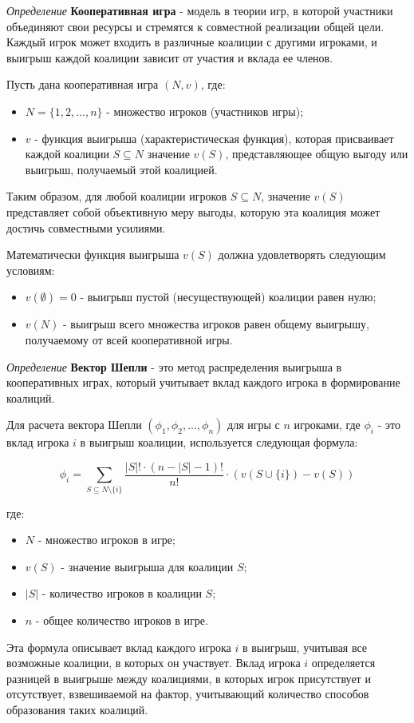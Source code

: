 \textit{Определение} \textbf{Кооперативная игра} - модель в теории игр, в которой участники  объединяют свои ресурсы и стремятся к совместной реализации общей цели. Каждый игрок может входить в различные коалиции с другими игроками, и выигрыш каждой коалиции зависит от участия и вклада ее членов.

Пусть дана кооперативная игра \( (N, v) \), 
где:\begin{itemize}
    \item \( N = \{1, 2, ..., n\} \) - множество игроков (участников игры);
    \item \( v \) - функция выигрыша (характеристическая функция), которая присваивает каждой коалиции \( S \subseteq N \) значение \( v(S) \), представляющее общую выгоду или выигрыш, получаемый этой коалицией.
\end{itemize}

Таким образом, для любой коалиции игроков \( S \subseteq N \), значение \( v(S) \) представляет собой объективную меру выгоды, которую эта коалиция может достичь совместными усилиями.


Математически функция выигрыша \( v(S) \) должна удовлетворять следующим условиям:\
\begin{itemize}
    \item \( v(\emptyset) = 0 \) - выигрыш пустой (несуществующей) коалиции равен нулю;
    \item \( v(N) \) - выигрыш всего множества игроков равен общему выигрышу, получаемому от всей кооперативной игры.
\end{itemize}

\textit{Определение} \textbf{Вектор Шепли }- это метод распределения выигрыша в кооперативных играх, который учитывает вклад каждого игрока в формирование коалиций. 

Для расчета вектора Шепли \( (\phi_1, \phi_2, ..., \phi_n) \) для игры с \( n \) игроками, где \( \phi_i \) - это вклад игрока \( i \) в выигрыш коалиции, используется следующая формула:

\[
\phi_i = \sum_{S \subseteq N \setminus \{i\}} \frac{|S|! \cdot (n - |S| - 1)!}{n!} \cdot (v(S \cup \{i\}) - v(S))
\]

где:\begin{itemize}
    \item \( N \) - множество игроков в игре;
    \item \( v(S) \) - значение выигрыша для коалиции \( S \);
    \item \( |S| \) - количество игроков в коалиции \( S \);
    \item \( n \) - общее количество игроков в игре.
\end{itemize}

Эта формула описывает вклад каждого игрока \( i \) в выигрыш, учитывая все возможные коалиции, в которых он участвует. Вклад игрока \( i \) определяется разницей в выигрыше между коалициями, в которых игрок присутствует и отсутствует, взвешиваемой на фактор, учитывающий количество способов образования таких коалиций.

